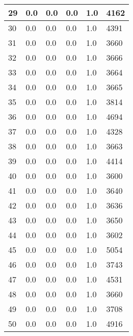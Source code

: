 \begin{longtable}{|l|l|l|l|l|l|}
29 & 0.0 & 0.0 & 0.0 & 1.0 & 4162 \\ \hline 
30 & 0.0 & 0.0 & 0.0 & 1.0 & 4391 \\ \hline 
31 & 0.0 & 0.0 & 0.0 & 1.0 & 3660 \\ \hline 
32 & 0.0 & 0.0 & 0.0 & 1.0 & 3666 \\ \hline 
33 & 0.0 & 0.0 & 0.0 & 1.0 & 3664 \\ \hline 
34 & 0.0 & 0.0 & 0.0 & 1.0 & 3665 \\ \hline 
35 & 0.0 & 0.0 & 0.0 & 1.0 & 3814 \\ \hline 
36 & 0.0 & 0.0 & 0.0 & 1.0 & 4694 \\ \hline 
37 & 0.0 & 0.0 & 0.0 & 1.0 & 4328 \\ \hline 
38 & 0.0 & 0.0 & 0.0 & 1.0 & 3663 \\ \hline 
39 & 0.0 & 0.0 & 0.0 & 1.0 & 4414 \\ \hline 
40 & 0.0 & 0.0 & 0.0 & 1.0 & 3600 \\ \hline 
41 & 0.0 & 0.0 & 0.0 & 1.0 & 3640 \\ \hline 
42 & 0.0 & 0.0 & 0.0 & 1.0 & 3636 \\ \hline 
43 & 0.0 & 0.0 & 0.0 & 1.0 & 3650 \\ \hline 
44 & 0.0 & 0.0 & 0.0 & 1.0 & 3602 \\ \hline 
45 & 0.0 & 0.0 & 0.0 & 1.0 & 5054 \\ \hline 
46 & 0.0 & 0.0 & 0.0 & 1.0 & 3743 \\ \hline 
47 & 0.0 & 0.0 & 0.0 & 1.0 & 4531 \\ \hline 
48 & 0.0 & 0.0 & 0.0 & 1.0 & 3660 \\ \hline 
49 & 0.0 & 0.0 & 0.0 & 1.0 & 3708 \\ \hline 
50 & 0.0 & 0.0 & 0.0 & 1.0 & 4916 \\ \hline 
\end{longtable}